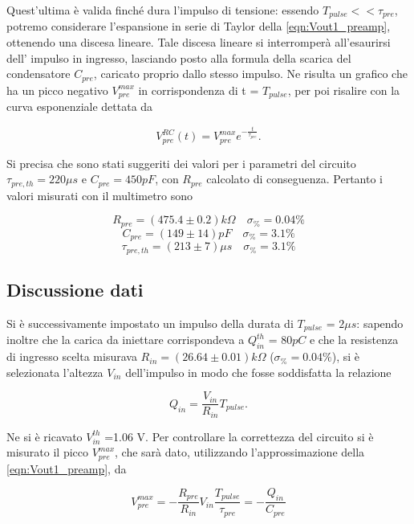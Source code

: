 \documentclass{article}
\begin{document}
Quest'ultima è valida finché dura l'impulso di tensione: essendo $T_{pulse} << \tau_{pre}$, potremo considerare l'espansione in 
serie di Taylor della \ref{eqn:Vout1_preamp}, ottenendo una discesa lineare. Tale discesa lineare si interromperà all'esaurirsi dell'
impulso in ingresso, lasciando posto alla formula della scarica del condensatore $C_{pre}$, caricato proprio dallo stesso impulso.
Ne risulta un grafico che ha un picco negativo $V_{pre}^{max}$ in corrispondenza di t = $T_{pulse}$, per poi risalire con la curva esponenziale
dettata da

\begin{equation}
    \label{eqn:Vout2_preamp}
    V_{pre}^{RC}(t) = V_{pre}^{max}e^{-\frac{t}{\tau_{pre}}}.
\end{equation}

Si precisa che sono stati suggeriti dei valori per i parametri del circuito $\tau_{pre,th} = 220 \mu s$ e $C_{pre} = 450 pF$, con $R_{pre}$ calcolato di 
conseguenza. Pertanto i valori misurati con il multimetro sono

\[
    R_{pre} = (475.4 \pm 0.2)k\Omega \quad \sigma_{\%}=0.04 \%    
\]
\[
    C_{pre} = (149 \pm 14) pF \quad \sigma_{\%}=3.1 \%    
\]
\[
    \tau_{pre,th} = (213 \pm 7)\mu s \quad \sigma_{\%}=3.1 \%     
\]

\subsection{Discussione dati}

Si è successivamente impostato un impulso della durata di $T_{pulse}$ = $2 \mu s$: sapendo inoltre che la carica da iniettare 
corrispondeva a $Q_{in}^{th}$ = $80 pC$ e che la resistenza di ingresso scelta misurava $R_{in}=(26.64\pm0.01) k\Omega$ ($\sigma_{\%}=0.04\%$), 
si è selezionata l'altezza $V_{in}$ dell'impulso in modo che fosse soddisfatta la relazione

\begin{equation}
    \label{eqn:Qin}
    Q_{in} = \frac{V_{in}}{R_{in}} T_{pulse}.
\end{equation}

Ne si è ricavato $V_{in}^{th}$ =1.06 V. Per controllare la correttezza del circuito si è misurato il picco $V_{pre}^{max}$, che sarà
dato, utilizzando l'approssimazione della \ref{eqn:Vout1_preamp}, da

\begin{equation}
    \label{eqn:Vpre_max}
    V_{pre}^{max} = -\frac{R_{pre}}{R_{in}} V_{in} \frac{T_{pulse}}{\tau_{pre}} = - \frac{Q_{in}}{C_{pre}}
\end{equation}
\end{document}
